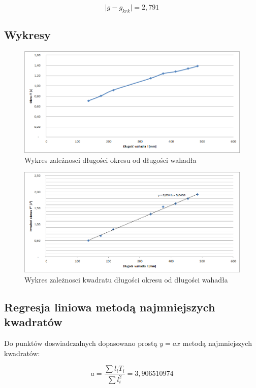 \documentclass[a4paper,10pt,twoside]{article}
\begin{document}
$$\vert g - g_{krk} \vert = 2,791$$

\newpage

\subsection{Wykresy}

\begin{figure}[!htp]
\centerline{\includegraphics[scale=1]{wykres1.png}}
\caption{Wykres zależnosci długości okresu od długości wahadła}
\label{fig:tl}
\end{figure}

\begin{figure}[!htp]
\centerline{\includegraphics[scale=1]{wykres2.png}}
\caption{Wykres zależnosci kwadratu długości okresu od długości wahadła}
\label{fig:ttl}
\end{figure}

\subsection{Regresja liniowa metodą najmniejszych kwadratów}

Do punktów doswiadczalnych dopasowano prostą $y = a x$ metodą najmniejszych kwadratów:

$$ a = \frac{\sum l_i T_i}{\sum l_i^2} = 3,906510974$$
\end{document}
